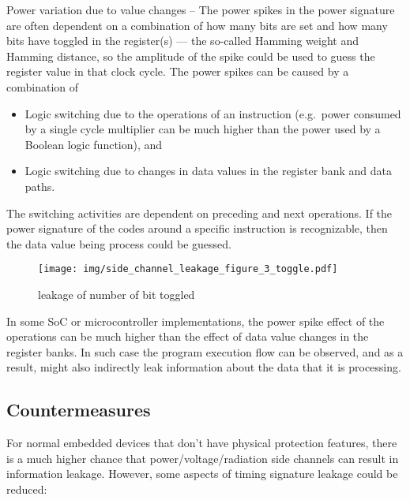 \documentclass[a4paper,]{report}
\makeatletter
\providecommand{\tightlist}{%
  \setlength{\itemsep}{0pt}\setlength{\parskip}{0pt}}
\newcounter{figno}
\newenvironment{fignos:no-prefix-figure-caption}{
  \caption@ifcompatibility{}{
    \let\oldthefigure\thefigure
    \let\oldtheHfigure\theHfigure
    \renewcommand{\thefigure}{figno:\thefigno}
    \renewcommand{\theHfigure}{figno:\thefigno}
    \stepcounter{figno}
    \captionsetup{labelformat=empty}
  }
}{
  \caption@ifcompatibility{}{
    \captionsetup{labelformat=default}
    \let\thefigure\oldthefigure
    \let\theHfigure\oldtheHfigure
    \addtocounter{figure}{-1}
  }
}
\makeatother
\begin{document}
Power variation due to value changes -- The power spikes in the power
signature are often dependent on a combination of how many bits are set
and how many bits have toggled in the register(s) --- the so-called
Hamming weight and Hamming distance, so the amplitude of the spike could
be used to guess the register value in that clock cycle. The power
spikes can be caused by a combination of

\begin{itemize}
\tightlist
\item
  Logic switching due to the operations of an instruction (e.g.~power
  consumed by a single cycle multiplier can be much higher than the
  power used by a Boolean logic function), and
\item
  Logic switching due to changes in data values in the register bank and
  data paths.
\end{itemize}

The switching activities are dependent on preceding and next operations.
If the power signature of the codes around a specific instruction is
recognizable, then the data value being process could be guessed.

\begin{fignos:no-prefix-figure-caption}

\begin{figure}
\centering
\texttt{[image: img/side\_channel\_leakage\_figure\_3\_toggle.pdf]}
\caption{leakage of number of bit toggled}
\end{figure}

\end{fignos:no-prefix-figure-caption}

In some SoC or microcontroller implementations, the power spike effect
of the operations can be much higher than the effect of data value
changes in the register banks. In such case the program execution flow
can be observed, and as a result, might also indirectly leak information
about the data that it is processing.

\hypertarget{countermeasures}{%
\subsection{Countermeasures}\label{countermeasures}}

For normal embedded devices that don't have physical protection
features, there is a much higher chance that power/voltage/radiation
side channels can result in information leakage. However, some aspects
of timing signature leakage could be reduced:
\end{document}
